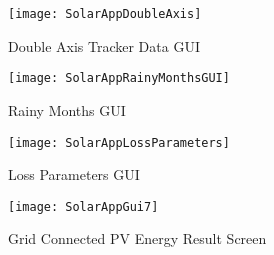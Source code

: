 \begin{figure}[H]
\centering
\texttt{[image: SolarAppDoubleAxis]}
\caption{Double Axis Tracker Data GUI}
\label{figApp1_10} %
\end{figure}

\begin{figure}[H]
\centering
\texttt{[image: SolarAppRainyMonthsGUI]}
\caption{Rainy Months GUI}
\label{figApp1_11} %
\end{figure}

\begin{figure}[H]
\centering
\texttt{[image: SolarAppLossParameters]}
\caption{Loss Parameters GUI}
\label{figApp1_12} %
\end{figure}


\begin{figure}[H]
\centering
\texttt{[image: SolarAppGui7]}
\caption{Grid Connected PV Energy Result Screen}
\label{figApp1_13} %
\end{figure}